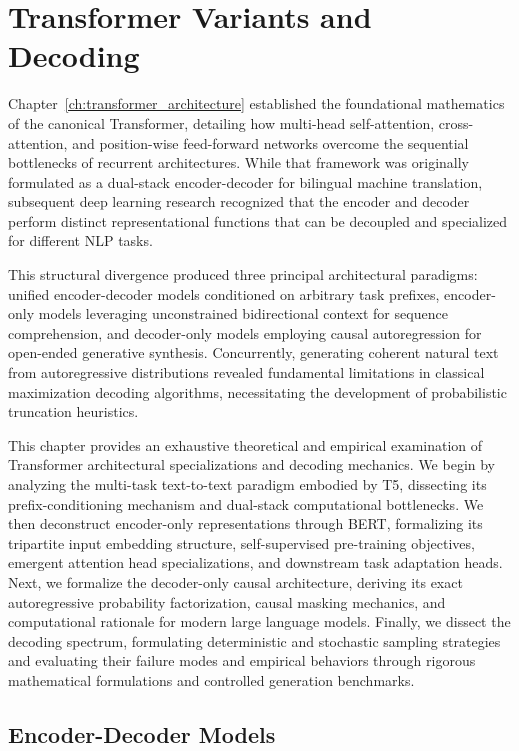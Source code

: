 \documentclass[../../main.tex]{subfiles}
\begin{document}
\chapter{Transformer Variants and Decoding}
\label{ch:transformer_variants}

Chapter~\ref{ch:transformer_architecture} established the foundational mathematics of the canonical Transformer, detailing how multi-head self-attention, cross-attention, and position-wise feed-forward networks overcome the sequential bottlenecks of recurrent architectures. While that framework was originally formulated as a dual-stack encoder-decoder for bilingual machine translation, subsequent deep learning research recognized that the encoder and decoder perform distinct representational functions that can be decoupled and specialized for different NLP tasks.

This structural divergence produced three principal architectural paradigms: unified encoder-decoder models conditioned on arbitrary task prefixes, encoder-only models leveraging unconstrained bidirectional context for sequence comprehension, and decoder-only models employing causal autoregression for open-ended generative synthesis. Concurrently, generating coherent natural text from autoregressive distributions revealed fundamental limitations in classical maximization decoding algorithms, necessitating the development of probabilistic truncation heuristics.

This chapter provides an exhaustive theoretical and empirical examination of Transformer architectural specializations and decoding mechanics. We begin by analyzing the multi-task text-to-text paradigm embodied by T5, dissecting its prefix-conditioning mechanism and dual-stack computational bottlenecks. We then deconstruct encoder-only representations through BERT, formalizing its tripartite input embedding structure, self-supervised pre-training objectives, emergent attention head specializations, and downstream task adaptation heads. Next, we formalize the decoder-only causal architecture, deriving its exact autoregressive probability factorization, causal masking mechanics, and computational rationale for modern large language models. Finally, we dissect the decoding spectrum, formulating deterministic and stochastic sampling strategies and evaluating their failure modes and empirical behaviors through rigorous mathematical formulations and controlled generation benchmarks.


\section{Encoder-Decoder Models}
\label{sec:encoder_decoder_models}
\end{document}
